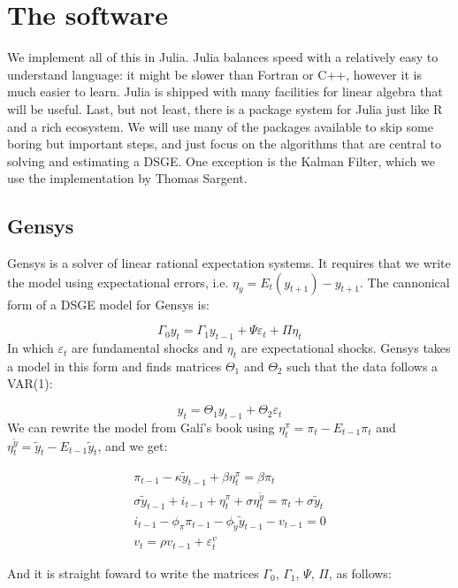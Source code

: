 \documentclass[12pt,a4paper]{article}
\begin{document}
\section{The software}
We implement all of this in Julia. Julia balances speed with a relatively easy to understand language: it might be slower than Fortran or C++, however it is much easier to learn. Julia is shipped with many facilities for linear algebra that will be useful. Last, but not least, there is a package system for Julia just like R and a rich ecosystem. We will use many of the packages available to skip some boring but important steps, and just focus on the algorithms that are central to solving and estimating a DSGE. One exception is the Kalman Filter, which we use the implementation by Thomas Sargent.

\subsection{Gensys}

Gensys is a solver of linear rational expectation systems. It requires that we write the model using expectational errors, i.e. $\eta_y = E_{t}(y_{t+1}) - y_{t+1}$. The cannonical form of a DSGE model for Gensys is:

\[
\Gamma_0 y_t = \Gamma_1 y_{t-1} + \Psi \varepsilon_t + \Pi \eta_t
\]
In which $\varepsilon_t$ are fundamental shocks and $\eta_t$ are expectational shocks. Gensys takes a model in this form and finds matrices $\Theta_1$ and $\Theta_2$ such that the data follows a VAR(1):

\[
y_t = \Theta_1 y_{t-1} + \Theta_2 \varepsilon_t
\]
We can rewrite the model from Galí's book using $\eta_t^{\pi} = \pi_t - E_{t-1} \pi_t$ and $\eta_t^{\tilde{y}} = \tilde{y}_t - E_{t-1} \tilde{y}_t$, and we get:

\begin{align} 
\pi_{t-1} - \kappa \tilde{y}_{t-1} + \beta \eta_t^{\pi} = \beta \pi_t\\
\sigma\tilde{y}_{t-1} + i_{t-1} + \eta_t^{\pi} + \sigma \eta_t^{\tilde{y}} = \pi_t + \sigma \tilde{y}_t\\
i_{t-1} - \phi_{\pi}\pi_{t-1} - \phi_{\tilde{y}} \tilde{y}_{t-1} - v_{t-1} = 0\\
v_t = \rho v_{t-1} + \varepsilon^v_t
\end{align}

And it is straight foward to write the matrices $\Gamma_0$, $\Gamma_1$, $\Psi$, $\Pi$, as follows:
\end{document}
